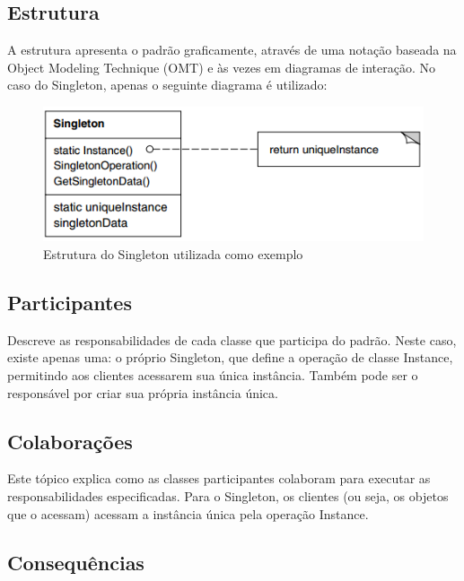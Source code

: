\subsection*{Estrutura}

A estrutura apresenta o padrão graficamente, através de uma 
notação baseada na Object Modeling Technique (OMT) e às vezes 
em diagramas de interação. No caso do Singleton, apenas o 
seguinte diagrama é utilizado:

\begin{figure}[htb]
	\caption{\label{fig_grafico}Estrutura do Singleton utilizada como exemplo \cite{gamma:1995}}
	\begin{center}
	    \includegraphics[scale=0.5]{4_referencial_teorico/2_padroes-projeto/singleton_structure.png}
	\end{center}
\end{figure}

\subsection*{Participantes}

Descreve as responsabilidades de cada classe que 
participa do padrão. Neste caso, existe 
apenas uma: o próprio Singleton, que define 
a operação de classe Instance, permitindo aos clientes 
acessarem sua única instância. Também pode ser o 
responsável por criar sua própria instância única.

\subsection*{Colaborações}

Este tópico explica como as classes participantes 
colaboram para executar as responsabilidades 
especificadas. Para o Singleton, os clientes (ou seja, 
os objetos que o acessam) acessam a instância única 
pela operação Instance.

\subsection*{Consequências}


